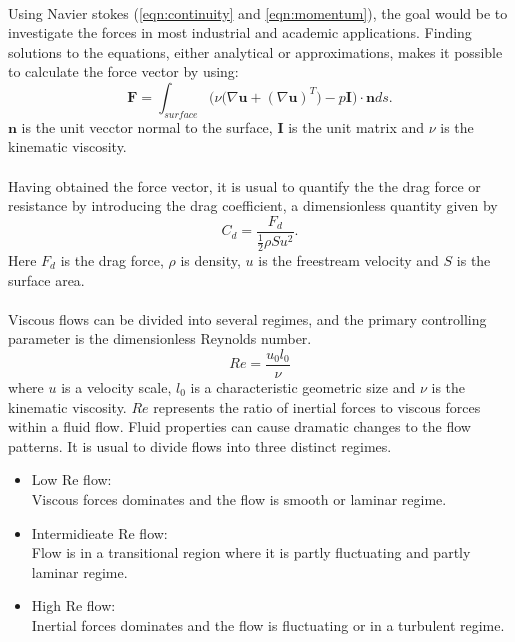 \documentclass[a4paper, 12pt]{report}
\begin{document}
\\
Using Navier stokes (\ref{eqn:continuity} and \ref{eqn:momentum}), the goal would be to investigate the forces in most industrial and academic applications. Finding solutions to the equations, either analytical or approximations, makes it possible to calculate the force vector by using:
\begin{equation}
\mathbf{F} = \int_{surface} \Big(\nu\big(\nabla \mathbf{u} + (\nabla \mathbf{u})^T\big) - p \mathbf{I}\Big) \cdot \mathbf{n} ds.
\label{eqn:forceVector}
\end{equation}
$\mathbf{n}$ is the unit vecctor normal to the surface, $\mathbf {I}$ is the unit matrix and $\nu$ is the kinematic viscosity. \\
\\
Having obtained the force vector, it is usual to quantify the the drag force or resistance by introducing the drag coefficient, a dimensionless quantity given by
\begin{equation}
C_d = \frac{F_d}{\frac{1}{2}\rho S u^2}.
\label{eqn:dragCoeff}
\end{equation}
Here $F_d$ is the drag force, $\rho$ is density, $u$ is the freestream velocity and $S$ is the surface area. \\
\\
Viscous flows can be divided into several regimes, and the primary controlling parameter is the dimensionless Reynolds number\cite{White}.
\begin{equation}
Re = \frac{u_0l_0}{\nu}
\label{eqn:ReynoldsNumber}
\end{equation}
where $u$ is a velocity scale, $l_0$ is a characteristic geometric size and $\nu$ is the kinematic viscosity. $Re$ represents the ratio of inertial forces to viscous forces within a fluid flow. Fluid properties can cause dramatic changes to the flow patterns. It is usual to divide flows into three distinct regimes.
\begin{itemize}
	\item Low Re flow: \\ Viscous forces dominates and the flow is smooth or laminar regime.
	\item Intermidieate Re flow: \\ Flow is in a transitional region where it is partly fluctuating and partly laminar regime.
	\item High Re flow: \\ Inertial forces dominates and the flow is fluctuating or in a turbulent regime.
\end{itemize} 
\end{document}
